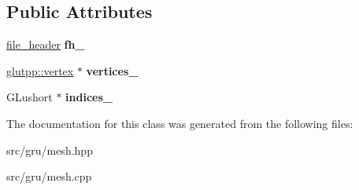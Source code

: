 \subsection*{\-Public \-Attributes}
\begin{DoxyCompactItemize}
\item 
\hypertarget{classglutpp_1_1mesh_a53e047bbd2ec923b2e5d4690bc182687}{\hyperlink{structglutpp_1_1file__header}{file\-\_\-header} {\bfseries fh\-\_\-}}\label{classglutpp_1_1mesh_a53e047bbd2ec923b2e5d4690bc182687}

\item 
\hypertarget{classglutpp_1_1mesh_ae983b2dd19dc6d0d13b86e8605e4d3db}{\hyperlink{structglutpp_1_1vertex}{glutpp\-::vertex} $\ast$ {\bfseries vertices\-\_\-}}\label{classglutpp_1_1mesh_ae983b2dd19dc6d0d13b86e8605e4d3db}

\item 
\hypertarget{classglutpp_1_1mesh_ad928372133364a0a0ed57d47ccee7ca1}{\-G\-Lushort $\ast$ {\bfseries indices\-\_\-}}\label{classglutpp_1_1mesh_ad928372133364a0a0ed57d47ccee7ca1}

\end{DoxyCompactItemize}


\-The documentation for this class was generated from the following files\-:\begin{DoxyCompactItemize}
\item 
src/gru/mesh.\-hpp\item 
src/gru/mesh.\-cpp\end{DoxyCompactItemize}
